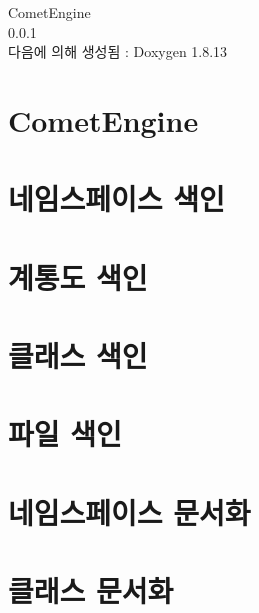 \documentclass[twoside]{book}
\newcommand{\+}{\discretionary{\mbox{\scriptsize$\hookleftarrow$}}{}{}}
\newcommand{\clearemptydoublepage}{%
  \newpage{\pagestyle{empty}\cleardoublepage}%
}
\begin{document}
\hypersetup{pageanchor=false,
             bookmarksnumbered=true,
             pdfencoding=unicode
            }
\begin{titlepage}
\vspace*{7cm}
\begin{center}%
{\Large Comet\+Engine \\[1ex]\large 0.\+0.\+1 }\\
\vspace*{1cm}
{\large 다음에 의해 생성됨 \+:  Doxygen 1.8.13}\\
\end{center}
\end{titlepage}
\clearemptydoublepage
{}
\tableofcontents
\clearemptydoublepage
{}
\hypersetup{pageanchor=true}

\chapter{Comet\+Engine}
\label{md__r_e_a_d_m_e}

\chapter{네임스페이스 색인}

\chapter{계통도 색인}

\chapter{클래스 색인}

\chapter{파일 색인}

\chapter{네임스페이스 문서화}








\chapter{클래스 문서화}










\end{document}

